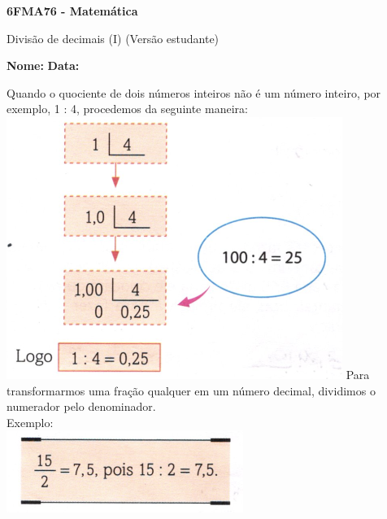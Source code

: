 \documentclass[a4paper,14pt]{article}
\begin{document}
	
	\noindent\textbf{6FMA76 - Matemática} 
	
	\begin{center}Divisão de decimais (I) (Versão estudante)
	\end{center}
	
	\noindent\textbf{Nome:} \underline{\hspace{10cm}}
	\noindent\textbf{Data:} \underline{\hspace{4cm}}
	
	
	\begin{multicols}{2}
		\noindent Quando o quociente de dois números inteiros não é um número inteiro, por exemplo, 1 : 4, procedemos da seguinte maneira: \\
		\includegraphics[width=1\linewidth]{6FMA76_imagens/imagem1}
		Para transformarmos uma fração qualquer em um número decimal, dividimos o numerador pelo denominador. \\
		Exemplo: \\
		\includegraphics[width=1\linewidth]{6FMA76_imagens/imagem2}
		

\end{multicols}
\end{document}
